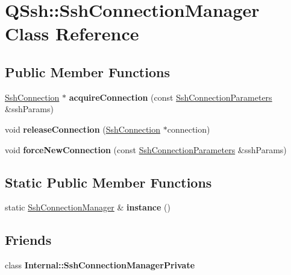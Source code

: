 \hypertarget{class_q_ssh_1_1_ssh_connection_manager}{}\section{Q\+Ssh\+:\+:Ssh\+Connection\+Manager Class Reference}
\label{class_q_ssh_1_1_ssh_connection_manager}
\subsection*{Public Member Functions}
\begin{DoxyCompactItemize}
\item 
\mbox{\label{class_q_ssh_1_1_ssh_connection_manager_a0e638aa592db3b4eadaa6d4f8fcf80dd}} 
\mbox{\hyperlink{class_q_ssh_1_1_ssh_connection}{Ssh\+Connection}} $\ast$ {\bfseries acquire\+Connection} (const \mbox{\hyperlink{class_q_ssh_1_1_ssh_connection_parameters}{Ssh\+Connection\+Parameters}} \&ssh\+Params)
\item 
\mbox{\label{class_q_ssh_1_1_ssh_connection_manager_a7b1ea6e00d4ba53f2534506d091704d2}} 
void {\bfseries release\+Connection} (\mbox{\hyperlink{class_q_ssh_1_1_ssh_connection}{Ssh\+Connection}} $\ast$connection)
\item 
\mbox{\label{class_q_ssh_1_1_ssh_connection_manager_a2cf24192018e1fe92e457a5e6bc3e8c2}} 
void {\bfseries force\+New\+Connection} (const \mbox{\hyperlink{class_q_ssh_1_1_ssh_connection_parameters}{Ssh\+Connection\+Parameters}} \&ssh\+Params)
\end{DoxyCompactItemize}
\subsection*{Static Public Member Functions}
\begin{DoxyCompactItemize}
\item 
\mbox{\label{class_q_ssh_1_1_ssh_connection_manager_aed301a8b687cc1d936250a89496376d3}} 
static \mbox{\hyperlink{class_q_ssh_1_1_ssh_connection_manager}{Ssh\+Connection\+Manager}} \& {\bfseries instance} ()
\end{DoxyCompactItemize}
\subsection*{Friends}
\begin{DoxyCompactItemize}
\item 
\mbox{\label{class_q_ssh_1_1_ssh_connection_manager_aca32217a434969171216ef4e2f8b6bec}} 
class {\bfseries Internal\+::\+Ssh\+Connection\+Manager\+Private}
\end{DoxyCompactItemize}


